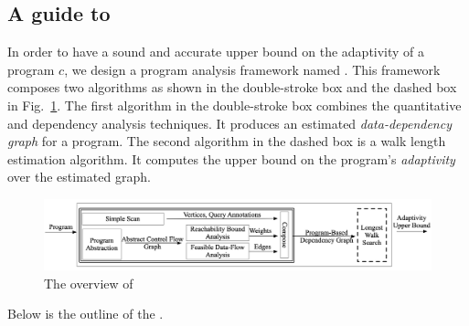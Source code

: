 \subsection{A guide to {\THESYSTEM} }
In order to have a sound and accurate upper bound on the  adaptivity of a program $c$,
we design a program analysis framework named {\THESYSTEM}.
This framework composes two algorithms as shown in the double-stroke box and the dashed box in Fig.~\ref{fig:adaptfun}.
The first algorithm in the double-stroke box combines the quantitative and dependency analysis techniques.
It produces an estimated \emph{data-dependency graph} for a program.
The second algorithm in the dashed box is a walk length estimation algorithm.
It computes the upper bound on the program's \emph{adaptivity} over the estimated graph.
\begin{figure}
  \centering    
\includegraphics[width=1.0\columnwidth]{adapfun.png}
  \vspace{-0.3cm}
  \caption{The overview of {\THESYSTEM}}
  \label{fig:adaptfun}
  \vspace{-0.5cm}
\end{figure}
%
Below is the outline of the {\THESYSTEM}.

